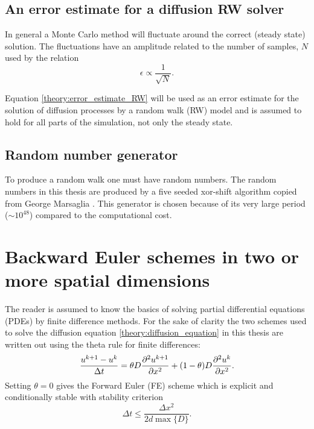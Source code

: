 \subsection{An error estimate for a diffusion RW solver}

In general a Monte Carlo method will fluctuate around the correct (steady state) solution. The fluctuations have an amplitude related to the number of samples, $N$ used by the relation
\begin{equation}\label{theory:error_estimate_RW}
 \epsilon \propto \frac{1}{\sqrt N}.
\end{equation}

\noindent Equation \eqref{theory:error_estimate_RW} will be used as an error estimate for the solution of diffusion processes by a random walk (RW) model and is assumed to hold for all parts of the simulation, not only the steady state.

\subsection{Random number generator}

To produce a random walk one must have random numbers. 
The random numbers in this thesis are produced by a five seeded xor-shift algorithm copied from George Marsaglia \cite{marsaglia2003xorshift}. 
This generator is chosen because of its very large period ($\sim10^{48}$) compared to the computational cost.

\section{Backward Euler schemes in two or more spatial dimensions}\label{theory:section:BE2D}

The reader is assumed to know the basics of solving partial differential equations (PDEs) by finite difference methods. For the sake of clarity the two schemes used to solve the diffusion equation \eqref{theory:diffusion_equation} in this thesis are written out using the theta rule for finite differences: 
\begin{equation}\label{theory_theta_rule}
 \frac{u^{k+1}-u^k}{\Delta t} = \theta D\frac{\partial^2 u^{k+1}}{\partial x^2} + (1-\theta)D\frac{\partial^2 u^{k}}{\partial x^2}.
\end{equation}
\noindent Setting $\theta = 0$ gives the Forward Euler (FE) scheme which is explicit and conditionally stable with stability criterion 
\begin{equation}\label{theory:stability_FE}
 \Delta t \leq \frac{\Delta x^2}{2d\max\{D\}}.
\end{equation}

